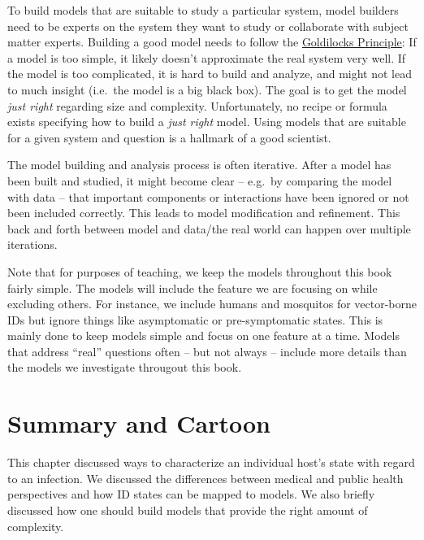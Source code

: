 \documentclass[]{book}
\theoremstyle{definition}
\theoremstyle{definition}
\theoremstyle{definition}
\theoremstyle{remark}
\begin{document}
To build models that are suitable to study a particular system, model
builders need to be experts on the system they want to study or
collaborate with subject matter experts. Building a good model needs to
follow the
\href{https://en.wikipedia.org/wiki/Goldilocks_principle}{Goldilocks
Principle}: If a model is too simple, it likely doesn't approximate the
real system very well. If the model is too complicated, it is hard to
build and analyze, and might not lead to much insight (i.e.~the model is
a big black box). The goal is to get the model \emph{just right}
regarding size and complexity. Unfortunately, no recipe or formula
exists specifying how to build a \emph{just right} model. Using models
that are suitable for a given system and question is a hallmark of a
good scientist.

The model building and analysis process is often iterative. After a
model has been built and studied, it might become clear -- e.g.~by
comparing the model with data -- that important components or
interactions have been ignored or not been included correctly. This
leads to model modification and refinement. This back and forth between
model and data/the real world can happen over multiple iterations.

Note that for purposes of teaching, we keep the models throughout this
book fairly simple. The models will include the feature we are focusing
on while excluding others. For instance, we include humans and mosquitos
for vector-borne IDs but ignore things like asymptomatic or
pre-symptomatic states. This is mainly done to keep models simple and
focus on one feature at a time. Models that address ``real'' questions
often -- but not always -- include more details than the models we
investigate througout this book.

\section{Summary and Cartoon}\label{summary-and-cartoon-1}

This chapter discussed ways to characterize an individual host's state
with regard to an infection. We discussed the differences between
medical and public health perspectives and how ID states can be mapped
to models. We also briefly discussed how one should build models that
provide the right amount of complexity.
\end{document}

